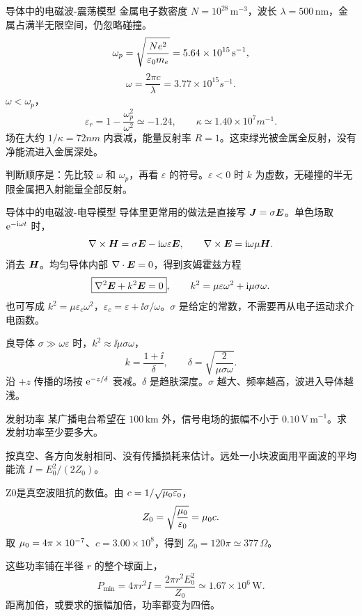 \begin{frame}{导体中的电磁波-震荡模型}
金属电子数密度 $N=10^{28}\,\mathrm{m^{-3}}$，波长 $\lambda=500\,\mathrm{nm}$，金属占满半无限空间，仍忽略碰撞。
\[
 \omega_p=\sqrt{\frac{Ne^2}{\varepsilon_0 m_e}}
 =5.64\times10^{15}\,\mathrm{s^{-1}},
\]
\[
 \omega=\frac{2\pi c}{\lambda}
 =3.77\times10^{15}\unit{s^{-1}}.
\]
$\omega<\omega_p$，
\[
 \varepsilon_r=1-\frac{\omega_p^2}{\omega^2}\simeq-1.24,
 \qquad
 \kappa\simeq1.40\times10^{7}\unit{m^{-1}}.
\]
场在大约 $1/\kappa=72\unit{nm}$ 内衰减，能量反射率 $R=1$。这束绿光被金属全反射，没有净能流进入金属深处。

判断顺序是：先比较 $\omega$ 和 $\omega_p$，再看 $\varepsilon$ 的符号。$\varepsilon<0$ 时 $k$ 为虚数，无碰撞的半无限金属把入射能量全部反射。
\end{frame}

\begin{frame}{导体中的电磁波-电导模型}
导体里更常用的做法是直接写 $\bm{J}=\sigma\bm{E}$。单色场取 $\mathrm e^{-\mathrm i\omega t}$ 时，
\[
 \nabla\times\bm{H}=\sigma\bm{E}-\mathrm i\omega\varepsilon\bm{E},
 \qquad
 \nabla\times\bm{E}=\mathrm i\omega\mu\bm{H}.
\]
消去 $\bm{H}$。均匀导体内部 $\nabla\cdot\bm{E}=0$，得到亥姆霍兹方程
\[
 \boxed{\nabla^2\bm{E}+k^2\bm{E}=0},
 \qquad
 k^2=\mu\varepsilon\omega^2+\mathrm i\mu\sigma\omega.
\]
也可写成 $k^2=\mu\varepsilon_c\omega^2$，$\varepsilon_c=\varepsilon+\ii\sigma/\omega$。$\sigma$ 是给定的常数，不需要再从电子运动求介电函数。

良导体 $\sigma\gg\omega\varepsilon$ 时，$k^2\approx\ii\mu\sigma\omega$，
\[
 k=\frac{1+\ii}{\delta},\qquad
 \delta=\sqrt{\frac{2}{\mu\sigma\omega}}.
\]
沿 $+z$ 传播的场按 $\mathrm e^{-z/\delta}$ 衰减。$\delta$ 是趋肤深度。$\sigma$ 越大、频率越高，波进入导体越浅。
\end{frame}

\begin{frame}{发射功率}
某广播电台希望在 $100\,\mathrm{km}$ 外，信号电场的振幅不小于 $0.10\,\mathrm{V\,m^{-1}}$。求发射功率至少要多大。

按真空、各方向发射相同、没有传播损耗来估计。远处一小块波面用平面波的平均能流 \(I=E_0^2/(2Z_0)\)。

Z0是真空波阻抗的数值。由 \(c=1/\sqrt{\mu_0\varepsilon_0}\)，
\[
 Z_0=\sqrt{\frac{\mu_0}{\varepsilon_0}}=\mu_0 c.
\]
取 \(\mu_0=4\pi\times10^{-7}\)、\(c=3.00\times10^{8}\)，得到 \(Z_0=120\pi\simeq377\,\Omega\)。

这些功率铺在半径 $r$ 的整个球面上，
\[
 \boxed{P_{\min}=4\pi r^2 I
 =\frac{2\pi r^2 E_0^2}{Z_0}
 \simeq1.67\times10^{6}\,\mathrm{W}}.
\]
距离加倍，或要求的振幅加倍，功率都变为四倍。
\end{frame}
